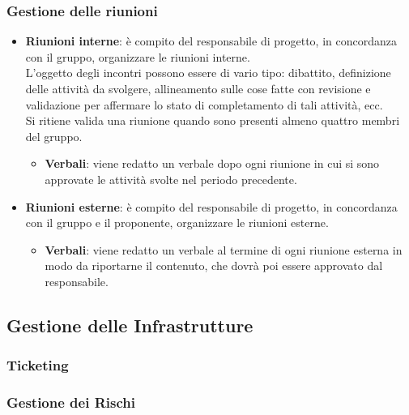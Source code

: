         \subsubsection{Gestione delle riunioni}
            \begin{itemize}
                \item \textbf{Riunioni interne}: è compito del responsabile di progetto, in concordanza con il gruppo, organizzare le riunioni interne. \\
                L'oggetto degli incontri possono essere di vario tipo: dibattito, definizione delle attività da svolgere, allineamento sulle cose fatte con revisione e validazione per affermare lo stato di completamento di tali attività, ecc. \\
                Si ritiene valida una riunione quando sono presenti almeno quattro membri del gruppo.
                    \begin{itemize}
                        \item \textbf{Verbali}: viene redatto un verbale dopo ogni riunione in cui si sono approvate le attività svolte nel periodo precedente.
                    \end{itemize}
                \item \textbf{Riunioni esterne}: è compito del responsabile di progetto, in concordanza con il gruppo e il proponente, organizzare le riunioni esterne.
                \begin{itemize}
                    \item \textbf{Verbali}: viene redatto un verbale al termine di ogni riunione esterna in modo da riportarne il contenuto, che dovrà poi essere approvato dal responsabile.
                \end{itemize}
            \end{itemize}

    \subsection{Gestione delle Infrastrutture}
        \subsubsection{Ticketing}
        \subsubsection{Gestione dei Rischi}
